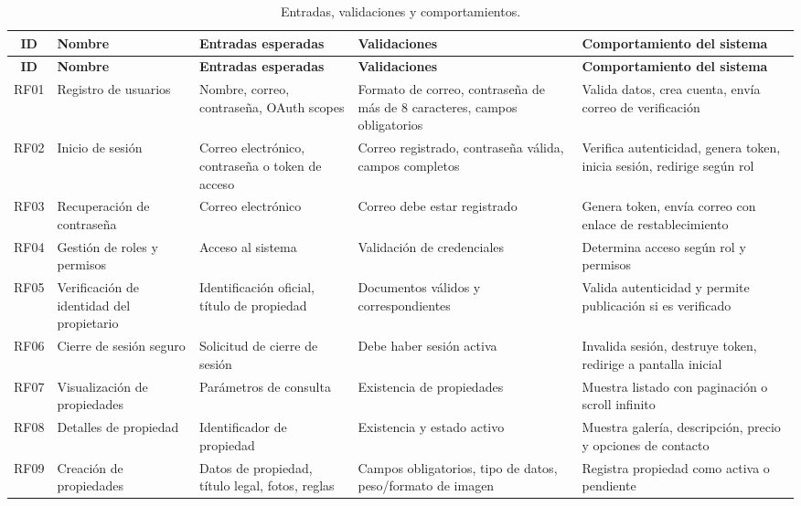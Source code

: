 \begin{landscape}
	\begin{longtable}{|c|p{4cm}|p{5cm}|p{5cm}|p{6cm}|}
		\caption{Entradas, validaciones y comportamientos.}
		\label{tab:entradas} \\
		\hline
		\textbf{ID} & \textbf{Nombre} & \textbf{Entradas esperadas} & \textbf{Validaciones} & \textbf{Comportamiento del sistema} \\
		\hline
		\endfirsthead
		\hline
		\textbf{ID} & \textbf{Nombre} & \textbf{Entradas esperadas} & \textbf{Validaciones} & \textbf{Comportamiento del sistema} \\
		\hline
		\endhead
		RF01 & Registro de usuarios & Nombre, correo, contraseña, OAuth scopes & Formato de correo, contraseña de más de 8 caracteres, campos obligatorios & Valida datos, crea cuenta, envía correo de verificación \\
		\hline
		RF02 & Inicio de sesión & Correo electrónico, contraseña o token de acceso & Correo registrado, contraseña válida, campos completos & Verifica autenticidad, genera token, inicia sesión, redirige según rol \\
		\hline
		RF03 & Recuperación de contraseña & Correo electrónico & Correo debe estar registrado & Genera token, envía correo con enlace de restablecimiento \\
		\hline
		RF04 & Gestión de roles y permisos & Acceso al sistema & Validación de credenciales & Determina acceso según rol y permisos \\
		\hline
		RF05 & Verificación de identidad del propietario & Identificación oficial, título de propiedad & Documentos válidos y correspondientes & Valida autenticidad y permite publicación si es verificado \\
		\hline
		RF06 & Cierre de sesión seguro & Solicitud de cierre de sesión & Debe haber sesión activa & Invalida sesión, destruye token, redirige a pantalla inicial \\
		\hline
		RF07 & Visualización de propiedades & Parámetros de consulta & Existencia de propiedades & Muestra listado con paginación o scroll infinito \\
		\hline
		RF08 & Detalles de propiedad & Identificador de propiedad & Existencia y estado activo & Muestra galería, descripción, precio y opciones de contacto \\
		\hline
		RF09 & Creación de propiedades & Datos de propiedad, título legal, fotos, reglas & Campos obligatorios, tipo de datos, peso/formato de imagen & Registra propiedad como activa o pendiente \\

\end{longtable}
\end{landscape}
